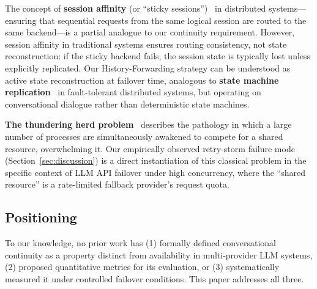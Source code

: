 The concept of \textbf{session affinity} (or ``sticky sessions'')~\cite{hunt2010zookeeper} in distributed systems---ensuring that sequential requests from the same logical session are routed to the same backend---is a partial analogue to our continuity requirement. However, session affinity in traditional systems ensures routing consistency, not state reconstruction: if the sticky backend fails, the session state is typically lost unless explicitly replicated. Our History-Forwarding strategy can be understood as active state reconstruction at failover time, analogous to \textbf{state machine replication}~\cite{schneider1990implementing} in fault-tolerant distributed systems, but operating on conversational dialogue rather than deterministic state machines.

\textbf{The thundering herd problem}~\cite{bonwick1994thundering} describes the pathology in which a large number of processes are simultaneously awakened to compete for a shared resource, overwhelming it. Our empirically observed retry-storm failure mode (Section~\ref{sec:discussion}) is a direct instantiation of this classical problem in the specific context of LLM API failover under high concurrency, where the ``shared resource'' is a rate-limited fallback provider's request quota.

\subsection{Positioning}

To our knowledge, no prior work has (1) formally defined conversational continuity as a property distinct from availability in multi-provider LLM systems, (2) proposed quantitative metrics for its evaluation, or (3) systematically measured it under controlled failover conditions. This paper addresses all three.
